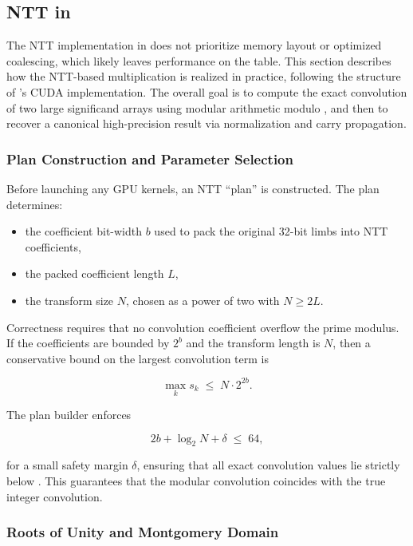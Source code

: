 \subsection{NTT in \FractalShark{}}

The NTT implementation in \FractalShark{} does not prioritize
memory layout or optimized coalescing, which likely leaves performance on the
table.  This section describes how the NTT-based
multiplication is realized in practice, following the structure of
\FractalShark{}'s CUDA implementation. The overall goal is to compute the exact
convolution of two large significand arrays using modular arithmetic modulo
, and then to recover a canonical high-precision result via
normalization and carry propagation.

\subsubsection{Plan Construction and Parameter Selection}

Before launching any GPU kernels, an NTT ``plan'' is constructed. The plan
determines:

\begin{itemize}

  \item the coefficient bit-width $b$ used to pack the original 32-bit limbs
  into NTT coefficients,

  \item the packed coefficient length $L$,

  \item the transform size $N$, chosen as a power of two with $N \ge 2L$.

\end{itemize}

Correctness requires that no convolution coefficient overflow the prime modulus.
If the coefficients are bounded by $2^b$ and the transform length is $N$, then a
conservative bound on the largest convolution term is

\[
\max_k s_k \;\le\; N \cdot 2^{2b}.
\]

The plan builder enforces

\[
2b + \log_2 N + \delta \;\le\; 64,
\]

for a small safety margin $\delta$, ensuring that all exact convolution values
lie strictly below . This guarantees that the modular
convolution coincides with the true integer convolution.

\subsubsection{Roots of Unity and Montgomery Domain}

